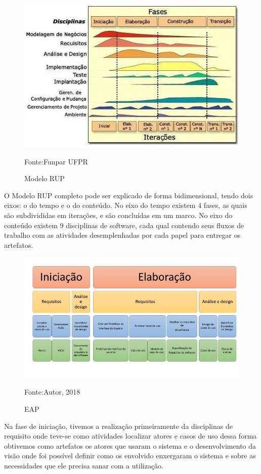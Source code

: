 \begin{figure}[H]
	\centering
	\includegraphics[scale=0.6]{img/fasesdisciplinaRUP.jpg}
	\caption{Modelo RUP}
	\label{modelorup}
	Fonte:Funpar UFPR
\end{figure}

O Modelo RUP completo pode ser explicado de forma bidimensional, tendo dois eixos: o do tempo e o do conteúdo. No eixo do tempo existem 4 fases, as quais são subdivididas em iterações, e são concluídas em um marco. No eixo do conteúdo existem 9 disciplinas de software, cada qual contendo seus fluxos de trabalho com as atividades desemplenhadas por cada papel para entregar os artefatos.

\begin{figure}[H]
	\centering
	\includegraphics[scale=0.6]{img/eaprup.jpeg}
	\caption{EAP}
	\label{eaprup}
	Fonte:Autor, 2018
\end{figure}


Na fase de iniciação, tivemos a realização primeiramente da disciplinas de requisito onde teve-se como atividades localizar atores e casos de uso dessa forma obtivemos como artefatos os atores que usaram o sistema e o desenvolvimento da visão onde foi possível definir como os envolvido enxergaram o sistema e sobre as necessidades que ele precisa sanar com a utilização.

